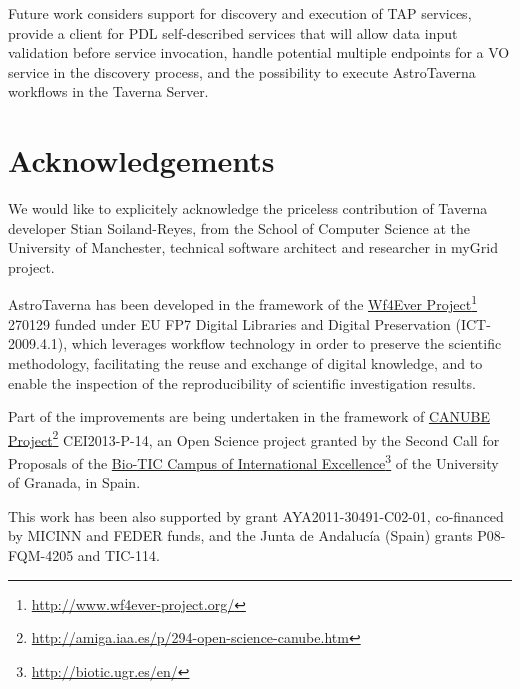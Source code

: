 \documentclass[final,authoryear,5p,times,twocolumn]{elsarticle}
\newcommand{\urlsamefont}[1]{\urlstyle{same}\url{#1}}
\newcommand{\hrefnote}[2]{\href{#1}{#2}\footnote{\urlsamefont{#1}}}
\begin{document}
Future work considers support for discovery and execution of TAP services, provide a client for PDL self-described services that will allow data input validation before service invocation, handle potential multiple endpoints for a VO service in the discovery process, and the possibility to execute AstroTaverna workflows in the Taverna Server.

\section{Acknowledgements}
\label{Acknowledgements}
We would like to explicitely acknowledge the priceless contribution of Taverna developer Stian Soiland-Reyes, from the School of Computer Science at the University of Manchester, technical software architect and researcher in myGrid project. 

AstroTaverna has been developed in the framework of the \hrefnote{http://www.wf4ever-project.org/}{Wf4Ever Project} 270129 funded under EU FP7 Digital Libraries and Digital Preservation (ICT-2009.4.1), which leverages workflow technology in order to preserve the scientific methodology, facilitating the reuse and exchange of digital knowledge, and to enable the inspection of the reproducibility of scientific investigation results.

Part of the improvements are being undertaken in the framework of \hrefnote{http://amiga.iaa.es/p/294-open-science-canube.htm}{CANUBE Project} CEI2013-P-14, an Open Science project granted by the Second Call for Proposals of the \hrefnote{http://biotic.ugr.es/en/}{Bio-TIC Campus of International Excellence} of the University of Granada, in Spain.

This work has been also supported by grant AYA2011-30491-C02-01, co-financed by MICINN and FEDER funds, and the Junta de Andalucía (Spain) grants P08-FQM-4205 and TIC-114.



\end{document}
